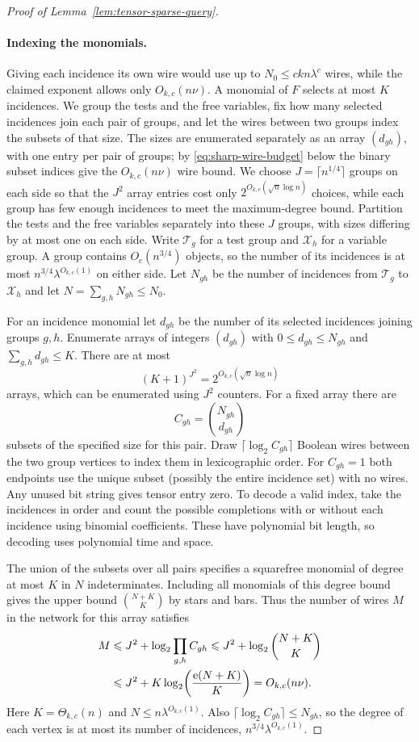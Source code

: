 \begin{proof}[Proof of Lemma~\ref{lem:tensor-sparse-query}]
\paragraph{Indexing the monomials.}
Giving each incidence its own wire would use up to
$N_0\le ckn\lambda^c$ wires, while the claimed exponent allows only
$O_{k,c}(n\nu)$. A monomial of $F$ selects at most $K$ incidences.
We group the tests and the free variables, fix how many selected
incidences join each pair of groups, and let the wires between two
groups index the subsets of that size. The sizes are enumerated
separately as an array $(d_{gh})$, with one entry per pair of groups;
by \eqref{eq:sharp-wire-budget} below the binary subset indices give
the $O_{k,c}(n\nu)$ wire bound. We choose
$J=\lceil n^{1/4}\rceil$ groups on each side so that the $J^2$
array entries cost only $2^{O_{k,c}(\sqrt n\log n)}$ choices,
while each group has few enough incidences to meet the
maximum-degree bound.
Partition the tests and the free variables separately into these
$J$ groups, with sizes differing by at most one on each side. Write $\mathcal T_g$ for a test group and
$\mathcal X_h$ for a variable group. A group contains
$O_c(n^{3/4})$ objects, so the number of its incidences is at most
$n^{3/4}\lambda^{O_{k,c}(1)}$ on either side. Let $N_{gh}$ be the
number of incidences from $\mathcal T_g$ to $\mathcal X_h$ and let
$N=\sum_{g,h}N_{gh}\le N_0$.

For an incidence monomial let $d_{gh}$ be the number of its
selected incidences joining groups $g,h$. Enumerate arrays of
integers $(d_{gh})$ with $0\le d_{gh}\le N_{gh}$ and
$\sum_{g,h}d_{gh}\le K$. There are at most
\[
 (K+1)^{J^2}=2^{O_{k,c}(\sqrt n\log n)}
\]
arrays, which can be enumerated using $J^2$ counters. For a fixed
array there are
\[
 C_{gh}=\binom{N_{gh}}{d_{gh}}
\]
subsets of the specified size for this pair. Draw
$\lceil\log_2 C_{gh}\rceil$ Boolean wires between the two group
vertices to index them in lexicographic order. For $C_{gh}=1$
both endpoints use the unique subset (possibly the entire incidence
set) with no wires. Any unused bit string gives tensor entry zero.
To decode a valid index, take the incidences in order and count the
possible completions with or without each incidence using binomial
coefficients. These have polynomial bit length, so decoding uses
polynomial time and space.

The union of the subsets over all pairs specifies a squarefree
monomial of degree at most $K$ in $N$ indeterminates. Including
all monomials of this degree bound gives the upper bound
$\binom{N+K}{K}$ by stars and bars. Thus the number
of wires $M$ in the network for this array satisfies
\begin{align}
 M &\le J^2+\log_2\prod_{g,h} C_{gh}
      \le J^2+\log_2\binom{N+K}{K} \notag\\
   &\le J^2+K\log_2\!\left(\frac{\mathrm e(N+K)}{K}\right)
      = O_{k,c}(n\nu).
 \label{eq:sharp-wire-budget}
\end{align}
Here $K=\Theta_{k,c}(n)$ and $N\le n\lambda^{O_{k,c}(1)}$.
Also $\lceil\log_2 C_{gh}\rceil\le N_{gh}$, so the degree of each
vertex is at most its number of incidences,
$n^{3/4}\lambda^{O_{k,c}(1)}$.


\end{proof}
